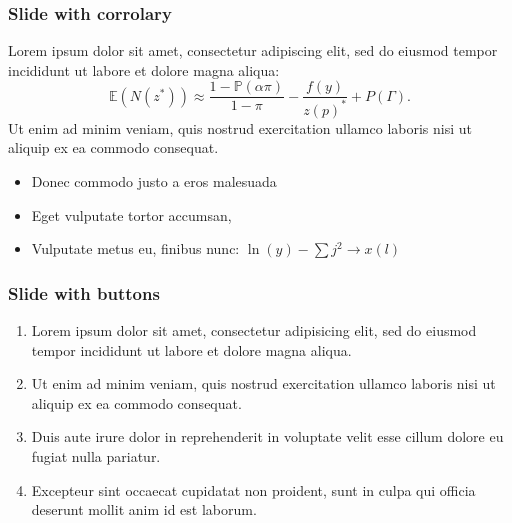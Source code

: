 \begin{frame}
\frametitle{Slide with corrolary}
\begin{corollary}
Lorem ipsum dolor sit amet, consectetur adipiscing elit, sed do eiusmod tempor incididunt ut labore et dolore magna aliqua:
\begin{equation*}
\mathbb{E}(N(z^*)) \approx \frac{1-\mathbb{P}(\alpha\pi)}{1-\pi}- \frac{f(y)}{z(p)^*} + P(\Gamma).
\end{equation*}
Ut enim ad minim veniam, quis nostrud exercitation ullamco laboris nisi ut aliquip ex ea commodo consequat.
\end{corollary}
\begin{itemize}
\item Donec commodo justo a eros malesuada
\item Eget vulputate tortor accumsan, 
\item Vulputate metus eu, finibus nunc: $\ln(y) - \sum j^2 \to x(l)$
\end{itemize}
\end{frame}

\begin{frame}
\end{frame}


\begin{frame}[label=firstSlide]
\frametitle{Slide with buttons}
\begin{enumerate}
\item Lorem ipsum dolor sit amet, consectetur adipisicing elit, sed do eiusmod
tempor incididunt ut labore et dolore magna aliqua.
\item  Ut enim ad minim veniam, quis nostrud exercitation ullamco laboris nisi ut aliquip ex ea commodo consequat. 
\item Duis aute irure dolor in reprehenderit in voluptate velit esse
cillum dolore eu fugiat nulla pariatur. 
\item Excepteur sint occaecat cupidatat non proident, sunt in culpa qui officia deserunt mollit anim id est laborum.
\end{enumerate}
\hyperlink{backupSlide}{}
\hyperlink{anotherBackupSlide}{}
\end{frame}

